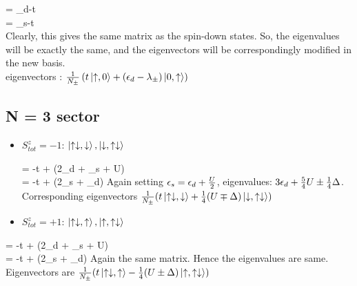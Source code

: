 \documentclass[12pt]{article}
\begin{document}
\beq
\ham{} = \epsilon_d-t \\
\ham{} = \epsilon_s-t \\
\eeq
Clearly, this gives the same matrix as the spin-down states. So, the eigenvalues will be exactly the same, and the eigenvectors will be correspondingly modified in the new basis. \\
eigenvectors : \(\frac{1}{N_\pm}\left({t\ket{\uparrow,0}+(\epsilon_d-\lambda_\pm)\ket{0,\uparrow}}\right)\)
\subsection{N = 3 sector}
\begin{itemize}
\item \(S_{tot}^z = -1\): \(\ket{\uparrow\downarrow,\downarrow}, \ket{\downarrow,\uparrow\downarrow}\)

\beq
\ham \ket{\uparrow\downarrow,\downarrow} = -t\ket{\downarrow,\uparrow\downarrow} + (2\epsilon_d + \epsilon_s + U)\ket{\uparrow\downarrow,\downarrow} \\
\ham \ket{\downarrow,\uparrow\downarrow} = -t\ket{\uparrow\downarrow,\downarrow} + (2\epsilon_s + \epsilon_d)\ket{\downarrow,\uparrow\downarrow}
\eeq
\beq
{}
\eeq
Again setting \(\epsilon_s = \epsilon_d + \frac{U}{2}\), eigenvalues: \(3\epsilon_d + \frac{5}{4}U \pm \frac{1}{4}\Delta\). \\ Corresponding eigenvectors \(\frac{1}{N_\pm}(t\ket{\uparrow\downarrow,\downarrow}+\frac{1}{4}(U\mp\Delta)\ket{\downarrow,\uparrow\downarrow})\)

\item \(S_{tot}^z = +1\): \(\ket{\uparrow\downarrow,\uparrow}, \ket{\uparrow,\uparrow\downarrow}\)
\end{itemize}

\beq
\ham \ket{\uparrow\downarrow,\uparrow} = -t\ket{\uparrow,\uparrow\downarrow} + (2\epsilon_d + \epsilon_s + U)\ket{\uparrow\downarrow,\uparrow} \\
\ham \ket{\uparrow,\uparrow\downarrow} = -t\ket{\uparrow\downarrow,\uparrow} + (2\epsilon_s + \epsilon_d)\ket{\uparrow,\uparrow\downarrow}
\eeq
Again the same matrix. Hence the eigenvalues are same. Eigenvectors are
\(\frac{1}{N_\pm}(t\ket{\uparrow\downarrow,\uparrow}-\frac{1}{4}(U\pm\Delta)\ket{\uparrow,\uparrow\downarrow})\)
\end{document}
